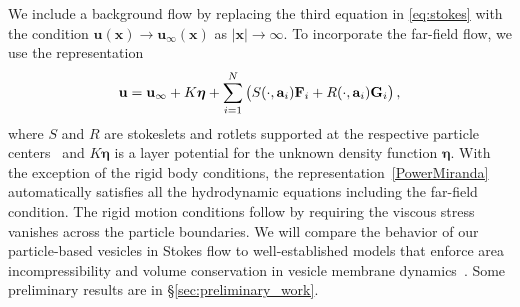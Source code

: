 We include a background flow by replacing the third equation in
\eqref{eq:stokes} with the condition $\mathbf{u}(\mathbf{x})
\to \mathbf{u}_{\infty}(\mathbf{x})$ as $|\mathbf{x}| \to
\infty$. To incorporate the far-field flow, we use the representation 
\begin{align}
\label{PowerMiranda}
  {\bf u} = {\bf u}_{\infty} + K\boldsymbol{\eta} + 
    \sum_{i=1}^N \left(S(\cdot, {\bf a}_i) {\bf F}_i + 
                 R(\cdot, {\bf a}_i) {\bf G}_i\right),
\end{align}
where $S$ and $R$ are stokeslets and rotlets supported at the respective
particle centers~\cite{leal_2007} and $K\boldsymbol{\eta}$ is a layer
potential for the unknown density function $\boldsymbol{\eta}$. With the
exception of the rigid body conditions, the
representation~\eqref{PowerMiranda} automatically satisfies all the
hydrodynamic equations including the far-field condition. The rigid
motion conditions follow by requiring the viscous stress vanishes across
the particle boundaries.
%
We will compare the behavior of our particle-based vesicles in Stokes
flow to well-established models that enforce area incompressibility and
volume conservation in vesicle membrane
dynamics~\cite{torres-sanchez_millan_arroyo_2019,mahapatra_saintillan_rangamani_2020, Steigmann99, C6SM02452A}.
Some preliminary results are in \S \ref{sec:preliminary_work}. 
%
%
%

